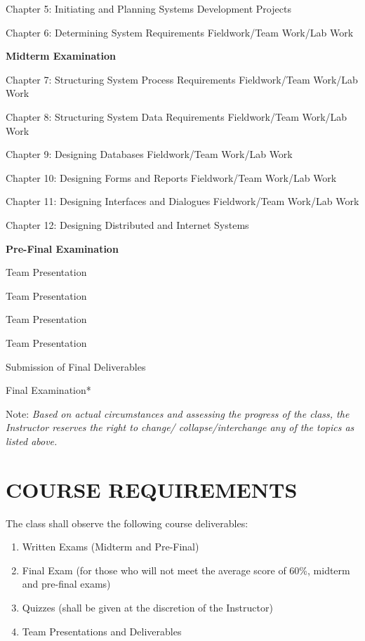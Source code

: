 Chapter 5: Initiating and Planning Systems Development Projects

Chapter 6: Determining System Requirements Fieldwork/Team Work/Lab Work

\textbf{Midterm Examination}

Chapter 7: Structuring System Process Requirements Fieldwork/Team
Work/Lab Work

Chapter 8: Structuring System Data Requirements Fieldwork/Team Work/Lab
Work

Chapter 9: Designing Databases Fieldwork/Team Work/Lab Work

Chapter 10: Designing Forms and Reports Fieldwork/Team Work/Lab Work

Chapter 11: Designing Interfaces and Dialogues Fieldwork/Team Work/Lab
Work

Chapter 12: Designing Distributed and Internet Systems

\textbf{Pre-Final Examination}

Team Presentation

Team Presentation

Team Presentation

Team Presentation

Submission of Final Deliverables

Final Examination*

Note: \emph{Based on actual circumstances and assessing the progress of
the class, the Instructor reserves the right to change/
collapse/interchange any of the topics as listed above.}

\hypertarget{course-requirements}{%
\section{COURSE REQUIREMENTS}\label{course-requirements}}

The class shall observe the following course deliverables:

\begin{enumerate}
\def\labelenumi{\arabic{enumi}.}
\tightlist
\item
  Written Exams (Midterm and Pre-Final)
\item
  Final Exam (for those who will not meet the average score of 60\%,
  midterm and pre-final exams)
\item
  Quizzes (shall be given at the discretion of the Instructor)
\item
  Team Presentations and Deliverables
\end{enumerate}

